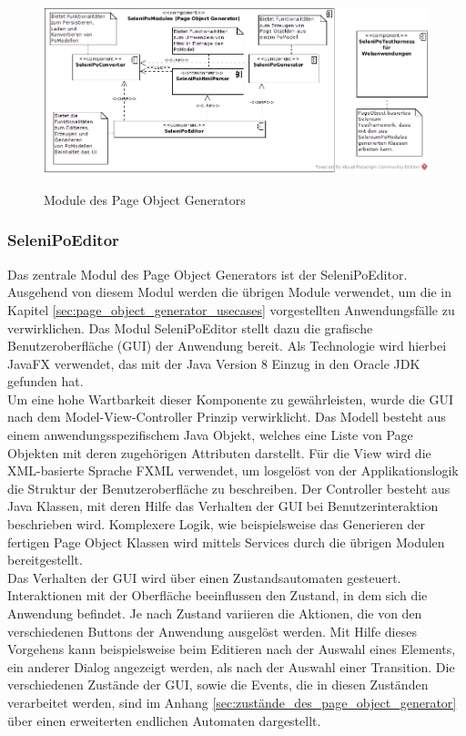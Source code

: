 \begin{figure}[htb]
  \centering  
  \includegraphics[scale=0.46]{img/ComponentDiagram.jpg}\\
  \caption{Module des Page Object Generators}
  \label{fig:component_diagramm}
\end{figure}

\subsubsection{SeleniPoEditor}
\label{sec:selenipoeditor}

Das zentrale Modul des Page Object Generators ist der SeleniPoEditor.
Ausgehend von diesem Modul werden die übrigen Module verwendet, um die in Kapitel \ref{sec:page_object_generator_usecases} vorgestellten Anwendungsfälle zu verwirklichen.
Das Modul SeleniPoEditor stellt dazu die grafische Benutzeroberfläche (GUI) der Anwendung bereit.
Als Technologie wird hierbei JavaFX \cite{oracle_client_2015} verwendet, das mit der Java Version 8 Einzug in den Oracle JDK gefunden hat. \\
Um eine hohe Wartbarkeit dieser Komponente zu gewährleisten, wurde die GUI nach dem Model-View-Controller Prinzip verwirklicht.
Das Modell besteht aus einem anwendungsspezifischem Java Objekt, welches eine Liste von Page Objekten mit deren zugehörigen Attributen darstellt.
Für die View wird die XML-basierte Sprache FXML verwendet, um losgelöst von der Applikationslogik die Struktur der Benutzeroberfläche zu beschreiben.
Der Controller besteht aus Java Klassen, mit deren Hilfe das Verhalten der GUI bei Benutzerinteraktion beschrieben wird.
Komplexere Logik, wie beispielsweise das Generieren der fertigen Page Object Klassen wird mittels Services durch die übrigen Modulen bereitgestellt.\\
Das Verhalten der GUI wird über einen Zustandsautomaten gesteuert.
Interaktionen mit der Oberfläche beeinflussen den Zustand, in dem sich die Anwendung befindet. Je nach Zustand variieren die Aktionen, die von den verschiedenen Buttons der Anwendung ausgelöst werden.
Mit Hilfe dieses Vorgehens kann beispielsweise beim Editieren nach der Auswahl eines Elements, ein anderer Dialog angezeigt werden, als nach der Auswahl einer Transition.
Die verschiedenen Zustände der GUI, sowie die Events, die in diesen Zuständen verarbeitet werden, sind im Anhang \ref{sec:zustände_des_page_object_generator} über einen erweiterten endlichen Automaten dargestellt.

